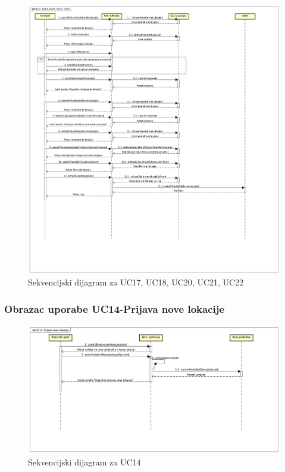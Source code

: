 				\begin{figure}[H]
        			\includegraphics[scale=0.3]{slike/Sekvencijski dijagrami/UC17, UC18, UC20, UC21, UC23.png}
        			\centering
        			\caption{Sekvencijski dijagram za UC17, UC18, UC20, UC21, UC22}
        			\label{fig:promjene}
        		\end{figure}
        		
        		\subsubsection{Obrazac uporabe UC14-Prijava nove lokacije}
				
				\begin{figure}[H]
        			\includegraphics[scale=0.4]{slike/Sekvencijski dijagrami/UC14-Prijava nove lokacije.png}
        			\centering
        			\caption{Sekvencijski dijagram za UC14}
        			\label{fig:promjene}
        		\end{figure}
	
